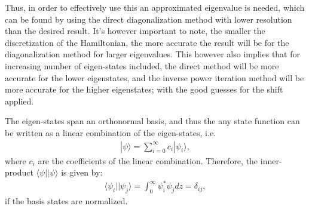 \documentclass[a4paper]{article}
\newcommand{\w}{\omega}
\newcommand{\newparagraph}{\vspace{.5cm}\noindent}
\newcommand{\ket}[1]{|#1\rangle}
\newcommand{\bra}[1]{\langle #1|}
\begin{document}
Thus, in order to effectively use this an approximated eigenvalue is needed, which can be found by using the direct diagonalization method with lower resolution than the desired result.
It's however important to note, the smaller the discretization of the Hamiltonian, the more accurate the result will be for the diagonalization method for larger eigenvalues.
This however also implies that for increasing number of eigen-states included, the direct method will be more accurate for the lower eigenstates, and the inverse power iteration method will be more accurate for the higher eigenstates;
with the good guesses for the shift applied.

\newparagraph
\begin{comment}
Due to the nature of this system, we also include that the ladder operators, $\hat{a}$ and $\hat{a}^\dagger$, can be used to find the eigen-states of the system, and their corresponding energies, by performing the matrix operator multiplication described in eq \eqref{eq: schrödinger}.
The ladder operators, are defined by:
\begin{align*}
    \hat{a} &= \sqrt{\frac{m\w}{2\hbar}}\left(\hat{x} + \frac{i}{m\w}\hat{p}\right),\\
    \hat{a}^\dagger &= \sqrt{\frac{m\w}{2\hbar}}\left(\hat{x} - \frac{i}{m\w}\hat{p}\right),
\end{align*}and with the change of basis to the dimensionless form, we get:
\begin{align}
    \hat{a} &= \frac{1}{\sqrt{2}}\left(z + \frac{d}{dz}\right),\label{eq: down}\\
    \hat{a}^\dagger &= \frac{1}{\sqrt{2}}\left(z - \frac{d}{dz}\right)\label{eq: up}.
\end{align}This then allows us to find the eigen-state $i$ by applying the creation operator on the previous state, i.e.
\begin{align*}
    \ket{\psi_{i + 1}} = \hat{a}^\dagger\ket{\psi_i}.
\end{align*}We can represent the $\hat{a}$ operators as matrices, where the derivative is also approximated by a finite difference method.
\end{comment}
The eigen-states span an orthonormal basis, and thus the any state function can be written as a linear combination of the eigen-states, i.e.
\begin{align*}
    \ket{\psi} = \sum_{i = 0}^{\infty}c_i\ket{\psi_i},
\end{align*}where $c_i$ are the coefficients of the linear combination. Therefore, the inner-product $\bra{\psi}\ket{\psi}$ is given by:
\begin{align*}
    \bra{\psi_i}\ket{\psi_j} = \int_0^{\infty}\psi_i^*\psi_jdz = \delta_{ij},
\end{align*}if the basis states are normalized.
\end{document}
